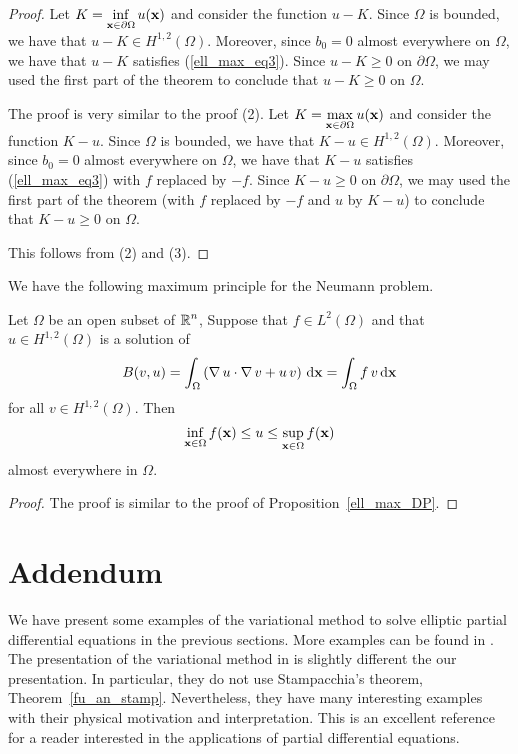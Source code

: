 \begin{proof}
 Let $\displaystyle K = \inf_{\mathbf{x}\in \partial \Omega} u(\mathbf{x})$ and
consider the function $u-K$.  Since $\Omega$ is bounded, we have that
$\displaystyle u-K \in H^{1,2}(\Omega)$.  Moreover, since $b_0 = 0$ almost
everywhere on $\Omega$, we have that $u-K$ satisfies
(\ref{ell_max_eq3}).  Since $u-K\geq 0$ on $\partial \Omega$, we may
used the first part of the theorem to conclude that $u-K\geq 0$ on
$\Omega$.

 The proof is very similar to the proof (2). Let
$\displaystyle K = \max_{\mathbf{x}\in \partial \Omega} u(\mathbf{x})$ and
consider the function $K-u$.  Since $\Omega$ is bounded, we have that
$\displaystyle K-u \in H^{1,2}(\Omega)$.  Moreover, since $b_0 = 0$ almost
everywhere on $\Omega$, we have that $K-u$ satisfies
(\ref{ell_max_eq3}) with $f$ replaced by $-f$.  Since
$K-u\geq 0$ on $\partial \Omega$, we may
used the first part of the theorem (with $f$ replaced by $-f$ and $u$
by $K-u$) to conclude that $K-u\geq 0$ on $\Omega$.

 This follows from (2) and (3).
\end{proof}

We have the following maximum principle for the Neumann problem.

\begin{prop} \label{ell_max_NP}
Let $\Omega$ be an open subset of $\displaystyle \mathbb{R}^n$,  Suppose that
$\displaystyle f\in L^2(\Omega)$ and that $\displaystyle u\in H^{1,2}(\Omega)$
is a solution of 
\[
B(v,u) =
\int_\Omega \left( \operatorname{\nabla} u \cdot \operatorname{\nabla} v +
u\,v \right) \,\mathrm{d}{\mathbf{x}} = \int_\Omega f\,v \,\mathrm{d}{\mathbf{x}}
\]
for all $\displaystyle v \in H^{1,2}(\Omega)$.  Then
\[
\inf_{\mathbf{x}\in \Omega} f(\mathbf{x}) \leq u \leq
\sup_{\mathbf{x}\in \Omega} f(\mathbf{x})
\]
almost everywhere in $\Omega$.
\end{prop}

\begin{proof}
The proof is similar to the proof of Proposition~\ref{ell_max_DP}.
\end{proof}

\section{Addendum}

We have present some examples of the variational method to solve
elliptic partial differential equations in the previous sections.
More examples can be found in \cite{Br,Sal}.  The presentation of the
variational method in \cite{Sal} is slightly different the our
presentation.  In particular, they do not use Stampacchia's theorem,
Theorem~\ref{fu_an_stamp}.  Nevertheless, they have many interesting
examples with their physical motivation and interpretation.  This is
an excellent reference for a reader interested in the applications of
partial differential equations.


